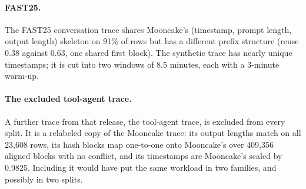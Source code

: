 \paragraph{FAST25.}
The FAST25 conversation trace shares Mooncake's (timestamp, prompt length, output length) skeleton
on 91\% of rows but has a different prefix structure (reuse 0.38 against 0.63, one shared first
block). The synthetic trace has nearly unique timestamps; it is cut into two windows of 8.5
minutes, each with a 3-minute warm-up.

\paragraph{The excluded tool-agent trace.}
A further trace from that release, the tool-agent trace, is excluded from every split.
It is a relabeled copy of the Mooncake trace: its output lengths match on all 23,608 rows, its
hash blocks map one-to-one onto Mooncake's over 409,356 aligned blocks with no conflict, and its
timestamps are Mooncake's scaled by 0.9825. Including it would have put the same workload in two
families, and possibly in two splits.

